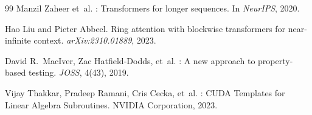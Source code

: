 \documentclass[10pt,twocolumn]{article}
\begin{document}
\begin{thebibliography}{99}
Manzil Zaheer et~al.
: Transformers for longer sequences.
\newblock In \emph{NeurIPS}, 2020.

Hao Liu and Pieter Abbeel.
\newblock Ring attention with blockwise transformers for near-infinite context.
\newblock \emph{arXiv:2310.01889}, 2023.

David R.~MacIver, Zac Hatfield-Dodds, et~al.
: A new approach to property-based testing.
\newblock \emph{JOSS}, 4(43), 2019.

Vijay Thakkar, Pradeep Ramani, Cris Cecka, et~al.
: CUDA Templates for Linear Algebra Subroutines.
\newblock NVIDIA Corporation, 2023.

\end{thebibliography}
\end{document}
